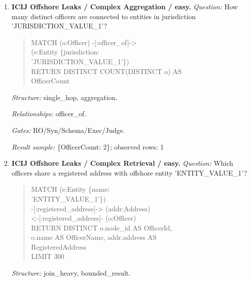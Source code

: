 \begin{enumerate}
\begin{quote}
-[:registered\_address]-\textgreater{} (addr:Address)\\
RETURN DISTINCT COUNT(addr) \textgreater{} 0 AS\\
HasRegisteredAddress
\end{quote}
\textit{Structure:} single\_hop, aggregation, optional.\par
\textit{Relationships:} registered\_address.\par
\textit{Gates:} RO/Syn/Schema/Exec/Judge.\par
\textit{Result sample:} \{HasRegisteredAddress: True\}; observed rows: 1
\item \textbf{ICIJ Offshore Leaks / Complex Aggregation / easy.}
\textit{Question:} How many distinct officers are connected to entities in jurisdiction 'JURISDICTION\_VALUE\_1'?
\begin{quote}\scriptsize\ttfamily\raggedright\sloppy
MATCH (o:Officer) -[:officer\_of]-\textgreater{}\\
(e:Entity \{jurisdiction:\\
'JURISDICTION\_VALUE\_1'\})\\
RETURN DISTINCT COUNT(DISTINCT o) AS\\
OfficerCount
\end{quote}
\textit{Structure:} single\_hop, aggregation.\par
\textit{Relationships:} officer\_of.\par
\textit{Gates:} RO/Syn/Schema/Exec/Judge.\par
\textit{Result sample:} \{OfficerCount: 2\}; observed rows: 1
\item \textbf{ICIJ Offshore Leaks / Complex Retrieval / easy.}
\textit{Question:} Which officers share a registered address with offshore entity 'ENTITY\_VALUE\_1'?
\begin{quote}\scriptsize\ttfamily\raggedright\sloppy
MATCH (e:Entity \{name:\\
'ENTITY\_VALUE\_1'\})\\
-[:registered\_address]-\textgreater{} (addr:Address)\\
\textless{}-[:registered\_address]- (o:Officer)\\
RETURN DISTINCT o.node\_id AS OfficerId,\\
o.name AS OfficerName, addr.address AS\\
RegisteredAddress\\
LIMIT 300
\end{quote}
\textit{Structure:} join\_heavy, bounded\_result.\par

\end{enumerate}
